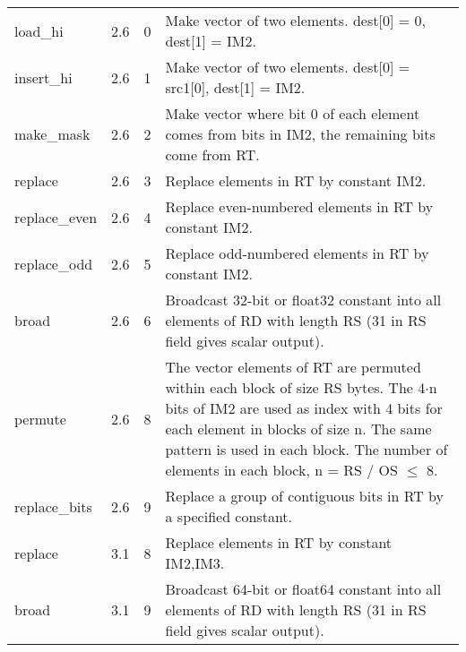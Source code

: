 \documentclass[forwardcom.tex]{subfiles}
\begin{document}
\begin{longtable} {|p{25mm}|p{12mm}|p{12mm}|p{95mm}|}
load\_hi      & 2.6 & 0 & Make vector of two elements. dest[0] = 0, dest[1] = IM2. \\
insert\_hi    & 2.6 & 1 & Make vector of two elements. dest[0] = src1[0], dest[1] = IM2. \\
make\_mask    & 2.6 & 2 & Make vector where bit 0 of each element comes from bits in IM2, the remaining bits come from RT. \\
replace       & 2.6 & 3 & Replace elements in RT by constant IM2. \\
replace\_even & 2.6 & 4 & Replace even-numbered elements in RT by constant
IM2. \\
replace\_odd  & 2.6 & 5 & Replace odd-numbered elements in RT by constant
IM2. \\
broad         & 2.6 & 6 & Broadcast 32-bit or float32 constant into all elements of RD with length RS (31 in RS field gives scalar output). \\
permute       & 2.6 & 8 & The vector elements of RT are permuted within each block of size RS bytes. The 4$\cdot$n bits of IM2 are used as index with 4 bits for
each element in blocks of size n. The same pattern is used in each
block. The number of elements in each block, n = RS / OS $\leq$ 8. \\
replace\_bits & 2.6 &  9  & Replace a group of contiguous bits in RT by a specified constant. \\
replace       & 3.1 & 8 & Replace elements in RT by constant IM2,IM3. \\
broad         & 3.1 & 9 & Broadcast 64-bit or float64 constant into all elements of RD with length RS (31 in RS field gives scalar output). \\
\hline
\end{longtable}
\end{document}
